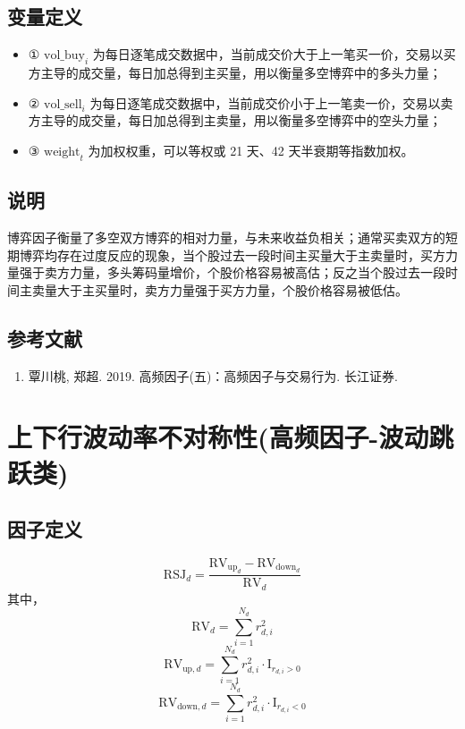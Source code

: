 \documentclass{article}
\begin{document}
\subsection{变量定义}
\begin{itemize}
    \item ① \( \mathrm{vol\_buy}_i \) 为每日逐笔成交数据中，当前成交价大于上一笔买一价，交易以买方主导的成交量，每日加总得到主买量，用以衡量多空博弈中的多头力量；
    \item ② \( \mathrm{vol\_sell}_i \) 为每日逐笔成交数据中，当前成交价小于上一笔卖一价，交易以卖方主导的成交量，每日加总得到主卖量，用以衡量多空博弈中的空头力量；
    \item ③ \( \mathrm{weight}_t \) 为加权权重，可以等权或 21 天、42 天半衰期等指数加权。
\end{itemize}

\subsection{说明}
博弈因子衡量了多空双方博弈的相对力量，与未来收益负相关；通常买卖双方的短期博弈均存在过度反应的现象，当个股过去一段时间主买量大于主卖量时，买方力量强于卖方力量，多头筹码量增价，个股价格容易被高估；反之当个股过去一段时间主卖量大于主买量时，卖方力量强于买方力量，个股价格容易被低估。

\subsection{参考文献}
\begin{enumerate}
    \item 覃川桃, 郑超. 2019. 高频因子(五)：高频因子与交易行为. 长江证券.
\end{enumerate}

\section{上下行波动率不对称性(高频因子-波动跳跃类)}

\subsection{因子定义}
\begin{equation}
    \mathrm{RSJ}_d = \frac{\mathrm{RV}_{\mathrm{up}_d} - \mathrm{RV}_{\mathrm{down}_d}}{\mathrm{RV}_d}
\end{equation}
其中，
\begin{equation}
    \mathrm{RV}_d = \sum_{i=1}^{N_d} r_{d,i}^2
\end{equation}
\begin{equation}
    \mathrm{RV}_{\mathrm{up},d} = \sum_{i=1}^{N_d} r_{d,i}^2 \cdot \mathrm{I}_{r_{d,i}>0}
\end{equation}
\begin{equation}
    \mathrm{RV}_{\mathrm{down},d} = \sum_{i=1}^{N_d} r_{d,i}^2 \cdot \mathrm{I}_{r_{d,i}<0}
\end{equation}
\end{document}
